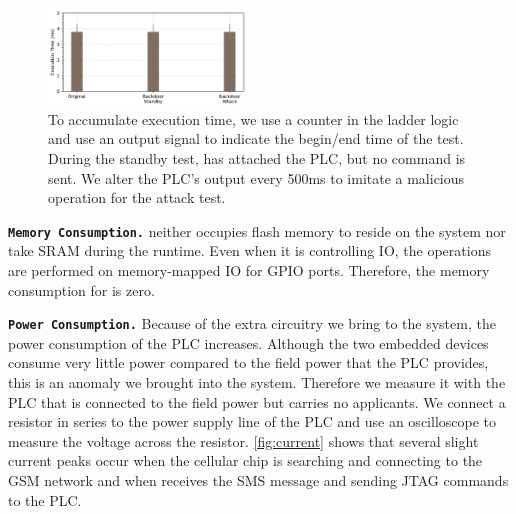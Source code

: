 \begin{figure}[h]
	\includegraphics[width=0.47\textwidth]{figures/exetime}
	\centering
	\caption{To accumulate execution time, we use a counter in the ladder logic and use an output signal to indicate the begin/end time of the test. During the standby test, \name has attached the PLC, but no command is sent. We alter the PLC's output every 500ms to imitate a malicious operation for the attack test.}
	\label{fig:exetime}
\end{figure}

\texttt{\textbf{Memory Consumption.}} \name neither occupies flash memory to reside on the system nor take SRAM during the runtime. Even when it is controlling IO, the operations are performed on memory-mapped IO for GPIO ports. Therefore, the memory consumption for \name is zero.



\texttt{\textbf{Power Consumption.}}  Because of the extra circuitry we bring to the system,  the power consumption of the PLC increases. Although the two embedded devices consume very little power compared to the field power that the PLC provides, this is an anomaly we brought into the system. Therefore we measure it with the PLC that is connected to the field power but carries no applicants. We connect a resistor in series to the power supply line of the PLC and use an oscilloscope to measure the voltage across the resistor. \autoref{fig:current} shows that several slight current peaks occur when the cellular chip is searching and connecting to the GSM network and when \name receives the SMS message and sending JTAG commands to the PLC.



